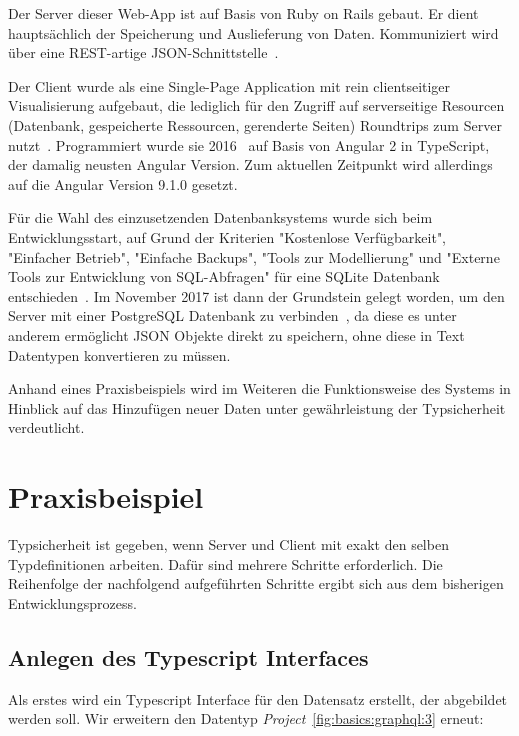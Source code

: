 Der Server dieser Web-App ist auf Basis von Ruby on Rails gebaut. Er dient hauptsächlich der Speicherung und Auslieferung von Daten.
Kommuniziert wird über eine REST-artige JSON-Schnittstelle~\cite[94]{riemer2016}.

Der Client wurde als eine Single-Page Application mit rein clientseitiger Visualisierung aufgebaut,
die lediglich für den Zugriff auf serverseitige Resourcen  (Datenbank, gespeicherte Ressourcen, gerenderte Seiten) Roundtrips zum Server nutzt~\cite[94-95]{riemer2016}.
Programmiert wurde sie 2016~\cite[1]{riemer2016} auf Basis von Angular 2 in TypeScript, der damalig neusten Angular Version.
Zum aktuellen Zeitpunkt wird allerdings auf die Angular Version 9.1.0 gesetzt.

Für die Wahl des einzusetzenden Datenbanksystems wurde sich beim Entwicklungsstart, auf Grund der Kriterien "Kostenlose Verfügbarkeit",
"Einfacher Betrieb", "Einfache Backups", "Tools zur Modellierung" und "Externe Tools zur Entwicklung von SQL-Abfragen"
für eine SQLite Datenbank entschieden~\cite[99-100]{riemer2016}. Im November 2017 ist dann der Grundstein gelegt worden,
um den Server mit einer PostgreSQL Datenbank zu verbinden~\cite{riemerPostgresCommit}, da diese es unter anderem ermöglicht JSON Objekte direkt zu speichern,
ohne diese in Text Datentypen konvertieren zu müssen.

Anhand eines Praxisbeispiels wird im Weiteren die Funktionsweise des Systems in Hinblick auf das Hinzufügen neuer Daten
unter gewährleistung der Typsicherheit verdeutlicht.

\section{Praxisbeispiel}
\label{sec:requirements:example}

Typsicherheit ist gegeben, wenn Server und Client mit exakt den
selben Typdefinitionen arbeiten. Dafür sind mehrere Schritte erforderlich.
Die Reihenfolge der nachfolgend aufgeführten Schritte ergibt sich aus dem bisherigen Entwicklungsprozess.

\subsection{Anlegen des Typescript Interfaces}
\label{sec:requirements:example:interface}

Als erstes wird ein Typescript Interface für den Datensatz erstellt, der abgebildet werden soll.
Wir erweitern den Datentyp \emph{Project}~\ref{fig:basics:graphql:3} erneut:

